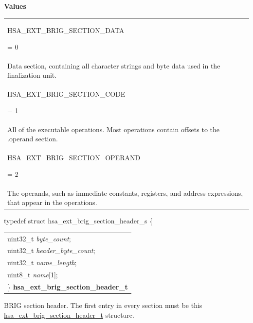 \documentclass[final]{book}
\newcommand{\reffld}[1]{\textit{#1}}
\newcommand{\reftyp}[1]{#1}
\newcommand{\refenu}[1]{\reftyp{#1}}
\begin{document}
\noindent\textbf{Values}\\[-5mm]
\begin{longtable}{@{\hspace{2em}}p{\linewidth-2em}}
\hspace{-2em}\hypertarget{group__FinalizerCoreApi_1gga3060576486841364f0842a76810aea06a9b040e9aae3efa23134666d054a3a839}{\refenu{HSA_EXT_BRIG_SECTION_DATA}} = 0\\Data section, containing all character strings and byte data used in the finalization unit.\\[2mm]
\hspace{-2em}\hypertarget{group__FinalizerCoreApi_1gga3060576486841364f0842a76810aea06a43997c8d8ab6c03c301c949bdb1819c7}{\refenu{HSA_EXT_BRIG_SECTION_CODE}} = 1\\All of the executable operations. Most operations contain offsets to the .operand section.\\[2mm]
\hspace{-2em}\hypertarget{group__FinalizerCoreApi_1gga3060576486841364f0842a76810aea06ae52428f823f64d4ad9a0d8e2e29aea0b}{\refenu{HSA_EXT_BRIG_SECTION_OPERAND}} = 2\\The operands, such as immediate constants, registers, and address expressions, that appear in the operations.
\end{longtable}

\noindent\begin{tcolorbox}[breakable,nobeforeafter,arc=0mm,colframe=white,colback=lightgray,left=0mm]
typedef struct  hsa_ext_brig_section_header_s \{
\vspace{-3.5mm}\begin{longtable}{@{}p{\textwidth}}
\hspace{1.7em}uint32_t \reffld{byte_count};\\
\hspace{1.7em}uint32_t \reffld{header_byte_count};\\
\hspace{1.7em}uint32_t \reffld{name_length};\\
\hspace{1.7em}uint8_t \reffld{name}[1];\\
\}  \hypertarget{group__FinalizerCoreApi_1gaf9d6f363926d83463e8458aa5b5b0cf6}{\textbf{hsa_ext_brig_section_header_t}}
\end{longtable}

\end{tcolorbox}
BRIG section header. The first entry in every section must be this \hyperlink{group__FinalizerCoreApi_1gaf9d6f363926d83463e8458aa5b5b0cf6}{hsa_ext_brig_section_header_t} structure.
\end{document}
